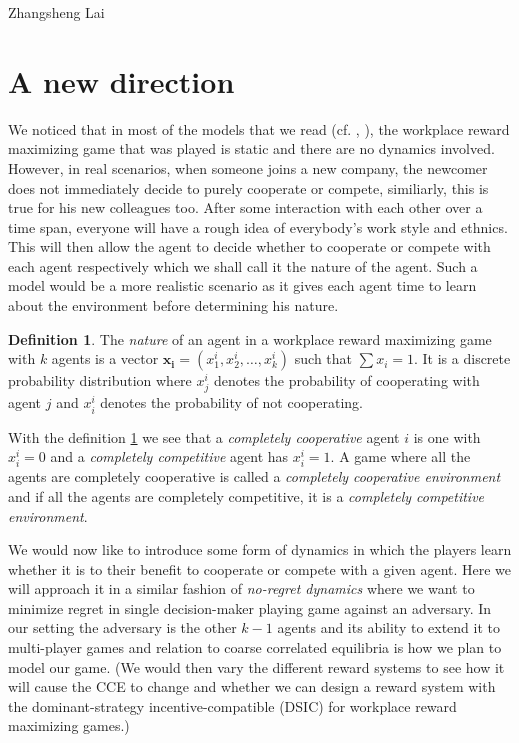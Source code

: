 \documentclass[a4paper,10pt]{article}
\theoremstyle{definition}
\newtheorem{defn}[thm]{Definition}
\begin{document}
\begin{flushright}
Zhangsheng Lai
\end{flushright}

\section*{A new direction}
We noticed that in most of the models that we read (cf.  \cite{Drago1991}, \cite{Chakravarti2015}), the workplace reward maximizing game that was played is static and there are no dynamics involved. However, in real scenarios, when someone joins a new company, the newcomer does not immediately decide to purely cooperate or compete, similiarly, this is true for his new colleagues too. After some interaction with each other over a time span, everyone will have a rough idea of everybody's work style and ethnics. This will then allow the agent to decide whether to cooperate or compete with each agent respectively which we shall call it the nature of the agent. Such a model would be a more realistic scenario as it gives each agent time to learn about the environment before determining his nature. 

\begin{defn}
The \emph{nature} of an agent in a workplace reward maximizing game with $k$ agents is a vector $\mathbf{x_i}=(x^i_1,x^i_2,\ldots, x^i_k)$ such that $\sum x_i=1$. It is a discrete probability distribution where $x^i_j$ denotes the probability of cooperating with agent $j$ and $x^i_i$ denotes the probability of not cooperating. \label{def:nature}
\end{defn}

With the definition \ref{def:nature} we see that a \emph{completely cooperative} agent $i$ is one with $x^i_i=0$ and a \emph{completely competitive} agent has $x^i_i=1$. A game where all the agents are completely cooperative is called a \emph{completely cooperative environment} and if all the agents are completely competitive, it is a \emph{completely competitive environment}.

We would now like to introduce some form of dynamics in which the players learn whether it is to their benefit to cooperate or compete with a given agent. Here we will approach it in a similar fashion of \emph{no-regret dynamics} where we want to minimize regret in single decision-maker playing game against an adversary. In our setting the adversary is the other $k-1$ agents and its ability to extend it to multi-player games and relation to coarse correlated equilibria is how we plan to model our game. (We would then vary the different reward systems to see how it will cause the CCE to change and whether we can design a reward system with the dominant-strategy incentive-compatible (DSIC) for workplace reward maximizing games.)
\end{document}
